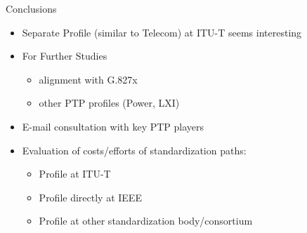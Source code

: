 \documentclass[compress,red]{beamer}
\begin{document}
\begin{frame}{Conclusions}

    \begin{itemize}
	\item Separate Profile (similar to Telecom) at ITU-T seems interesting
	\item For Further Studies 
	\begin{itemize}
	  \item alignment with G.827x 
	  \item other PTP profiles (Power, LXI)
	\end{itemize}
	\item E-mail consultation with key PTP players
	\item Evaluation of costs/efforts of standardization paths:
	  \begin{itemize}
	    \item Profile at ITU-T
	    \item Profile directly at IEEE
	    \item Profile at other standardization body/consortium
	  \end{itemize}

    \end{itemize}


\end{frame}
\section{}
\end{document}
